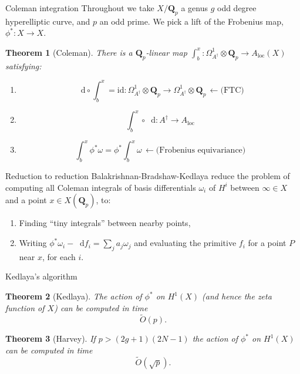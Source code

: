 \documentclass[notheorems]{beamer}
\theoremstyle{plain}
\newtheorem{theorem}{Theorem}[section]
\theoremstyle{definition}
\theoremstyle{definition}
\theoremstyle{definition}
\newcommand{\diff}{\mathop{}\!\mathrm{d}}
\newcommand{\QQ}{\mathbf{Q}}
\newcommand{\gt}{>}
\begin{document}
\begin{frame}{Coleman integration}
    Throughout we take \(X/\QQ_p\) a genus \(g\) odd degree hyperelliptic curve, and \(p\) an odd prime.
    We pick a lift of the Frobenius map, \(\phi^*\colon X \to X\).
    \begin{theorem}[{Coleman}]\label{thm-coleman-harvey-int}
        \hypertarget{p-2914}{}%
        There is a \(\QQ_p\)-linear map \(\int_b^x\colon \Omega_{A^\dagger}^1\otimes \QQ_p \to A_\mathrm{loc} (X)\) satisfying:\leavevmode%
        \begin{enumerate}
            \item\hypertarget{li-600}{}\hypertarget{p-2916}{}%
                \[\diff \circ \int_b^x = \mathrm{id}\colon \Omega_{A^\dagger}^1\otimes \QQ_p \to \Omega_{A^\dagger}^1\otimes \QQ_p\,\leftarrow\text{(FTC)}\]%
            \item\hypertarget{li-601}{}\hypertarget{p-2917}{}%
                \[\int_b^x\circ\diff \colon A^\dagger \to A_{\mathrm{loc}}\]%
            \item\hypertarget{li-599}{}\hypertarget{p-2915}{}%
                \[\int_b^x \phi^*\omega = \phi^*\int_b^x \omega\,\leftarrow\text{(Frobenius equivariance)}\]%
        \end{enumerate}
    \end{theorem}
\end{frame}

\begin{frame}{Reduction to reduction}
    Balakrishnan-Bradshaw-Kedlaya reduce the problem of computing all Coleman integrals of basis differentials \(\omega_i\) of \(H^i\) between \(\infty\in X\) and a point \(x\in X(\QQ_p)\), to:
    \begin{enumerate}
        \item Finding ``tiny integrals'' between nearby points,
        \item Writing \(\phi^*\omega_i  - \diff f_i=\sum_j a_j \omega_j \) and evaluating the primitive \(f_i\) for a point \(P\) near \(x\), for each \(i\).
    \end{enumerate}

\end{frame}

\begin{frame}{Kedlaya's algorithm}
    \begin{theorem}[Kedlaya]
        The action of \(\phi^*\) on \(H^1(X)\) (and hence the zeta function of \(X\)) can be computed in time
        \[
            \widetilde O(p)\text{.}
        \]
    \end{theorem}

    \begin{theorem}[Harvey]
        If \(p \gt (2g+1)(2N-1)\) the action of \(\phi^*\) on \(H^1(X)\) can be computed in time
        \[
            \widetilde O(\sqrt{p})\text{.}
        \]
    \end{theorem}

\end{frame}
\end{document}
